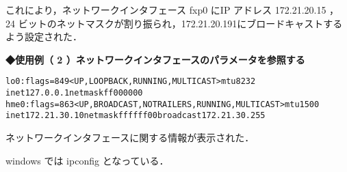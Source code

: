 これにより，ネットワークインタフェース fxp0 にIP アドレス 172.21.20.15 ， 24 ビットのネットマスクが割り振られ，172.21.20.191にブロードキャストするよう設定された．\par

{\bf ◆使用例（ 2 ）ネットワークインタフェースのパラメータを参照する}
\begin{center}
\begin{breakbox}
\begin{alltt}
 % \underline{ifconfig -a}  \keybox{Enter}
 lo0: flags=849<UP,LOOPBACK,RUNNING,MULTICAST> mtu 8232
         inet 127.0.0.1 netmask ff000000 
 hme0: flags=863<UP,BROADCAST,NOTRAILERS,RUNNING,MULTICAST> mtu 1500
         inet 172.21.30.10 netmask ffffff00 broadcast 172.21.30.255

\end{alltt}
\end{breakbox}
\end{center}
ネットワークインタフェースに関する情報が表示された．\par

windows では ipconfig となっている．
\clearpage
